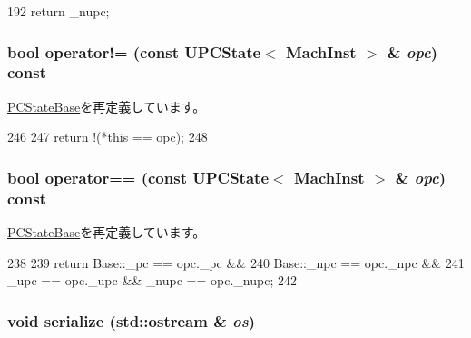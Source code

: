 \begin{DoxyCode}
192 { return _nupc; }
\end{DoxyCode}
\hypertarget{classGenericISA_1_1UPCState_ac308decf5b5542401a4d52a91f43331b}{
\subsubsection[{operator!=}]{\setlength{\rightskip}{0pt plus 5cm}bool operator!= (const {\bf UPCState}$<$ MachInst $>$ \& {\em opc}) const}}
\label{classGenericISA_1_1UPCState_ac308decf5b5542401a4d52a91f43331b}


\hyperlink{classGenericISA_1_1PCStateBase_af9600d6b82659d663fd0c8be2cbef409}{PCStateBase}を再定義しています。


\begin{DoxyCode}
246     {
247         return !(*this == opc);
248     }
\end{DoxyCode}
\hypertarget{classGenericISA_1_1UPCState_accc92b38a5f2592fb8bc4a32dcd7355c}{
\subsubsection[{operator==}]{\setlength{\rightskip}{0pt plus 5cm}bool operator== (const {\bf UPCState}$<$ MachInst $>$ \& {\em opc}) const}}
\label{classGenericISA_1_1UPCState_accc92b38a5f2592fb8bc4a32dcd7355c}


\hyperlink{classGenericISA_1_1PCStateBase_a8643649fe59176cb0c5e8b48738c36fe}{PCStateBase}を再定義しています。


\begin{DoxyCode}
238     {
239         return Base::_pc == opc._pc &&
240                Base::_npc == opc._npc &&
241                _upc == opc._upc && _nupc == opc._nupc;
242     }
\end{DoxyCode}
\hypertarget{classGenericISA_1_1UPCState_a53e036786d17361be4c7320d39c99b84}{
\subsubsection[{serialize}]{\setlength{\rightskip}{0pt plus 5cm}void serialize (std::ostream \& {\em os})}}
\label{classGenericISA_1_1UPCState_a53e036786d17361be4c7320d39c99b84}


